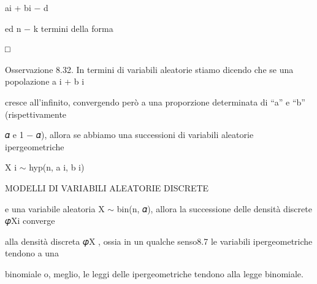 \documentclass[a4paper,portrait,12pt]{article}
\begin{document}
\begin{flushleft}
ai + bi $-$ d
\end{flushleft}





\begin{flushleft}
ed n $-$ k termini della forma
\end{flushleft}


□





\begin{flushleft}
Osservazione 8.32. In termini di variabili aleatorie stiamo dicendo che se una popolazione a i + b i
\end{flushleft}


\begin{flushleft}
cresce all'infinito, convergendo per\`{o} a una proporzione determinata di {``}a'' e {``}b'' (rispettivamente
\end{flushleft}


\begin{flushleft}
𝛼 e 1 $-$ 𝛼), allora se abbiamo una successioni di variabili aleatorie ipergeometriche
\end{flushleft}


\begin{flushleft}
X i $\sim$ hyp(n, a i, b i)
\end{flushleft}










\begin{flushleft}
MODELLI DI VARIABILI ALEATORIE DISCRETE
\end{flushleft}





\begin{flushleft}
e una variabile aleatoria X $\sim$ bin(n, 𝛼), allora la successione delle densit\`{a} discrete 𝜑Xi converge
\end{flushleft}


\begin{flushleft}
alla densit\`{a} discreta 𝜑X , ossia in un qualche senso8.7 le variabili ipergeometriche tendono a una
\end{flushleft}


\begin{flushleft}
binomiale o, meglio, le leggi delle ipergeometriche tendono alla legge binomiale.
\end{flushleft}
\end{document}
